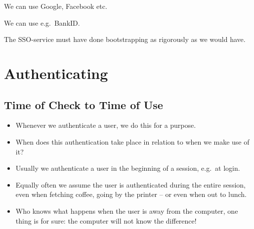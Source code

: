 \begin{frame}
  \begin{example}
    We can use Google, Facebook etc.
  \end{example}

  \begin{example}
    We can use e.g.\ BankID.
  \end{example}

  \begin{remark}
    The SSO-service must have done bootstrapping as rigorously as we would 
    have.
  \end{remark}
\end{frame}


\section{Authenticating}

\subsection{Time of Check to Time of Use}

\begin{frame}
  \begin{exercise}
    \begin{itemize}
      \item Whenever we authenticate a user, we do this for a purpose.

      \item When does this authentication take place in relation to when we make 
        use of it?
    \end{itemize}
  \end{exercise}
\end{frame}

\begin{frame}
  \begin{example}
    \begin{itemize}
      \item Usually we authenticate a user in the beginning of a session, e.g.\ 
        at login.

      \item Equally often we assume the user is authenticated during the entire 
        session, even when fetching coffee, going by the printer -- or even when 
        out to lunch.

      \item Who knows what happens when the user is away from the computer, one 
        thing is for sure: the computer will not know the difference!

    \end{itemize}
  \end{example}
\end{frame}

